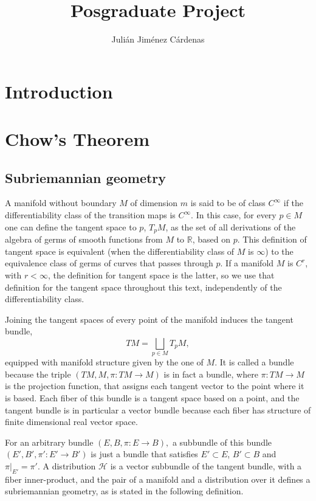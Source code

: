 \documentclass[12pt, letterpaper, reqno]{amsart}
\author{Julián Jiménez Cárdenas}
\title[Posgraduate Project]{Posgraduate Project}
\theoremstyle{definition}
\theoremstyle{plain}
\theoremstyle{remark}
\begin{document}
\maketitle

\begin{abstract}
\end{abstract}

\section*{Introduction}
\label{sec:0}


\section{Chow's Theorem}
\label{sec:1}

\subsection{Subriemannian geometry}%
\label{sub:subriemannian_geometry}


A manifold without boundary $M$ of dimension $ m $  is said to be of class $ C^\infty $ if the differentiability class of the transition maps is $C^\infty.$ In this case, for every $ p\in M $ one can define the tangent space to $ p $, $ T_pM $, as the set of all derivations of the algebra of germs of smooth functions from $ M $ to $ \mathbb{R}  $,  based on $ p $. This definition of tangent space is equivalent (when the differentiability class of $ M $ is $ \infty $) to the equivalence class of germs of curves that passes through $ p $. If a manifold $ M $  is $C^r$, with $r< \infty$, the definition for tangent space is the latter, so we use that definition for the tangent space throughout this text, independently of the differentiability class.

Joining the tangent spaces of every point of the manifold induces the tangent bundle,
$$ TM = \bigsqcup_{p\in M} T_pM, $$ 
equipped with manifold structure given by the one of $ M. $ It is called a bundle because the triple $ (TM, M,\pi:TM \rightarrow {M}) $ is in fact a bundle, where $ \pi:TM \rightarrow {M} $  is the projection function, that assigns each tangent vector to the point where it is based. Each fiber of this bundle is a tangent space based on a point, and the tangent bundle is in particular a vector bundle because each fiber has structure of finite dimensional real vector space. 

For an arbitrary bundle $ (E,B,\pi:E \rightarrow {B}), $ a subbundle of this bundle $ (E',B',\pi':E' \rightarrow {B'}) $  is just a bundle that satisfies $ E'\subset E $, $ B'\subset B $ and $ \pi|_{E'}=\pi'. $ A distribution $ \mathcal{H} $ is a vector subbundle of the tangent bundle, with a fiber inner-product, and the pair of a manifold and a distribution over it defines a subriemannian geometry, as is stated in the following definition.
\end{document}
